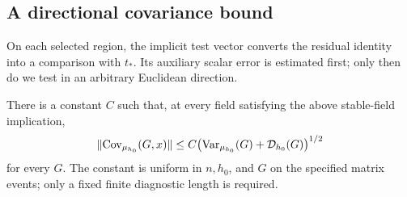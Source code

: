 \subsection{A directional covariance bound}
On each selected region, the implicit test vector converts the residual
identity into a comparison with $t_*$. Its auxiliary scalar error is
estimated first; only then do we test in an arbitrary Euclidean direction.
\begin{proposition}\label{prop:directional}
There is a constant $C$ such that, at every field satisfying the above
stable-field implication,
\begin{equation}\label{eq:directional}
 \lVert \operatorname{Cov}_{\mu_{h_0}}(G,x)\rVert
 \le C\bigl(\operatorname{Var}_{\mu_{h_0}}(G)+\mathcal D_{h_0}(G)\bigr)^{1/2}
\end{equation}
for every $G$. The constant is uniform in $n,h_0$, and $G$ on the specified
matrix events; only a fixed finite diagnostic length is required.
\end{proposition}

